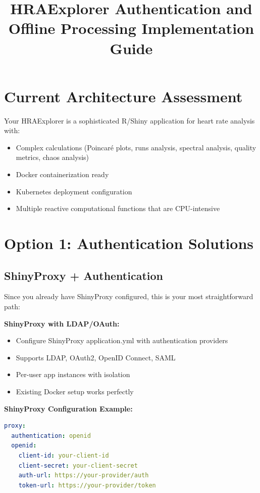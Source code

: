 \documentclass{article}
\title{HRAExplorer Authentication and Offline Processing Implementation Guide}
\author{}
\date{}
\begin{document}
\maketitle

\section{Current Architecture Assessment}

Your HRAExplorer is a sophisticated R/Shiny application for heart rate analysis with:
\begin{itemize}
\item Complex calculations (Poincaré plots, runs analysis, spectral analysis, quality metrics, chaos analysis)
\item Docker containerization ready
\item Kubernetes deployment configuration
\item Multiple reactive computational functions that are CPU-intensive
\end{itemize}

\section{Option 1: Authentication Solutions}

\subsection{ShinyProxy + Authentication}
Since you already have ShinyProxy configured, this is your most straightforward path:

\textbf{ShinyProxy with LDAP/OAuth:}
\begin{itemize}
\item Configure ShinyProxy application.yml with authentication providers
\item Supports LDAP, OAuth2, OpenID Connect, SAML
\item Per-user app instances with isolation
\item Existing Docker setup works perfectly
\end{itemize}

\textbf{ShinyProxy Configuration Example:}
\begin{lstlisting}[language=yaml]
proxy:
  authentication: openid
  openid:
    client-id: your-client-id
    client-secret: your-client-secret
    auth-url: https://your-provider/auth
    token-url: https://your-provider/token
\end{lstlisting}
\end{document}
